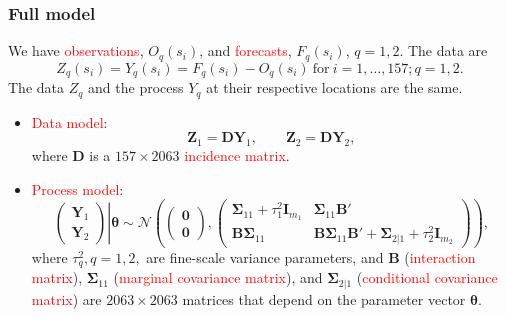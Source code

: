 \documentclass{beamer}
\newcommand{\Bmat} {\textbf{B}}
\newcommand{\Dmat} {\textbf{D}}
\newcommand{\Imat} {\textbf{I}}
\newcommand{\Yvec}{\mathbf{Y}}
\newcommand{\Zvec}{\mathbf{Z}}
\newcommand{\thetab}{\boldsymbol{\theta}}
\newcommand{\bzero}{\boldsymbol{0}}
\newcommand{\bSigma}{\bm{\Sigma}}
\newcommand{\red}{\textcolor{red}}%
\begin{document}

\begin{frame}
\frametitle{Full model}

We have \red{observations}, $O_q(s_i)$, and \red{forecasts}, $F_q(s_i)$, $q = 1,2$. The data are 
$$Z_q(s_i)=Y_q(s_i)=F_q(s_i)-O_q(s_i)~\textrm{for}~i =1,\dots,157; q = 1,2.$$ 
The data $Z_q$ and the process $Y_q$ at their respective locations are the same. 

\begin{itemize}
\item \textcolor{red}{{Data model}}:
\begin{equation*}
\Zvec_1 = \Dmat\Yvec_1, \qquad \Zvec_2 = \Dmat\Yvec_2,
\end{equation*}
where $\Dmat$ is a $157\times 2063$ \textcolor{red}{incidence matrix}.
\item \textcolor{red}{{Process model}}:
\begin{equation*}
\left.\begin{pmatrix} \Yvec_1 \\ \Yvec_2 \end{pmatrix}\right| \thetab \sim \mathcal{N}
\left(
\begin{pmatrix} \bzero \\ \bzero \end{pmatrix},
\begin{pmatrix}
\bSigma_{11} + \tau_1^2\Imat_{m_1} & \bSigma_{11}\Bmat' \\
\Bmat \bSigma_{11} & \Bmat \bSigma_{11}\Bmat' + \bSigma_{2|1} + \tau_2^2\Imat_{m_2}
\end{pmatrix}
\right),
\end{equation*}
\noindent where $\tau_q^2, q=1,2,$ are fine-scale variance parameters, and $\mathbf{B}$ (\textcolor{red}{interaction matrix}), $\bSigma_{11}$ (\textcolor{red}{marginal covariance matrix}), and $\bSigma_{2|1}$ (\textcolor{red}{conditional covariance matrix}) are $2063\times 2063$ matrices that depend on the parameter vector $\thetab$.
\end{itemize}
\end{frame}

\end{document}

